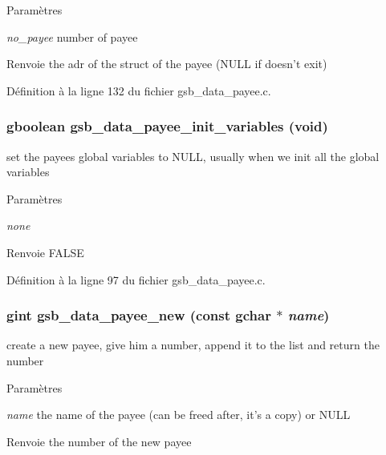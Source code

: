 \begin{DoxyParams}{Paramètres}
\item[{\em no\_\-payee}]number of payee\end{DoxyParams}
\begin{DoxyReturn}{Renvoie}
the adr of the struct of the payee (NULL if doesn't exit) 
\end{DoxyReturn}


Définition à la ligne 132 du fichier gsb\_\-data\_\-payee.c.

\subsubsection[{gsb\_\-data\_\-payee\_\-init\_\-variables}]{\setlength{\rightskip}{0pt plus 5cm}gboolean gsb\_\-data\_\-payee\_\-init\_\-variables (void)}\label{gsb__data__payee_8h_a22dc85bacf731dbdd5abc873db60ae2d}
set the payees global variables to NULL, usually when we init all the global variables


\begin{DoxyParams}{Paramètres}
\item[{\em none}]\end{DoxyParams}
\begin{DoxyReturn}{Renvoie}
FALSE 
\end{DoxyReturn}


Définition à la ligne 97 du fichier gsb\_\-data\_\-payee.c.

\subsubsection[{gsb\_\-data\_\-payee\_\-new}]{\setlength{\rightskip}{0pt plus 5cm}gint gsb\_\-data\_\-payee\_\-new (const gchar $\ast$ {\em name})}\label{gsb__data__payee_8h_a52d58725c813f6acd19b2e7f4056f162}
create a new payee, give him a number, append it to the list and return the number


\begin{DoxyParams}{Paramètres}
\item[{\em name}]the name of the payee (can be freed after, it's a copy) or NULL\end{DoxyParams}
\begin{DoxyReturn}{Renvoie}
the number of the new payee 
\end{DoxyReturn}


